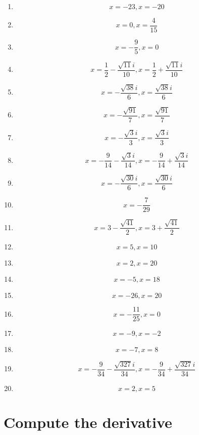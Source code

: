 \documentclass{article}
\begin{document}
        \begin{enumerate}
        \item$$x = -23, x = -20$$
\item$$x = 0, x = \frac{4}{15}$$
\item$$x = - \frac{9}{5}, x = 0$$
\item$$x = \frac{1}{2} - \frac{\sqrt{11} i}{10}, x = \frac{1}{2} + \frac{\sqrt{11} i}{10}$$
\item$$x = - \frac{\sqrt{38} i}{6}, x = \frac{\sqrt{38} i}{6}$$
\item$$x = - \frac{\sqrt{91}}{7}, x = \frac{\sqrt{91}}{7}$$
\item$$x = - \frac{\sqrt{3} i}{3}, x = \frac{\sqrt{3} i}{3}$$
\item$$x = - \frac{9}{14} - \frac{\sqrt{3} i}{14}, x = - \frac{9}{14} + \frac{\sqrt{3} i}{14}$$
\item$$x = - \frac{\sqrt{30} i}{6}, x = \frac{\sqrt{30} i}{6}$$
\item$$x = - \frac{7}{29}$$
\item$$x = 3 - \frac{\sqrt{41}}{2}, x = 3 + \frac{\sqrt{41}}{2}$$
\item$$x = 5, x = 10$$
\item$$x = 2, x = 20$$
\item$$x = -5, x = 18$$
\item$$x = -26, x = 20$$
\item$$x = - \frac{11}{25}, x = 0$$
\item$$x = -9, x = -2$$
\item$$x = -7, x = 8$$
\item$$x = - \frac{9}{34} - \frac{\sqrt{327} i}{34}, x = - \frac{9}{34} + \frac{\sqrt{327} i}{34}$$
\item$$x = 2, x = 5$$
        \end{enumerate}
        

        \section{Compute the derivative}
        
\end{document}
